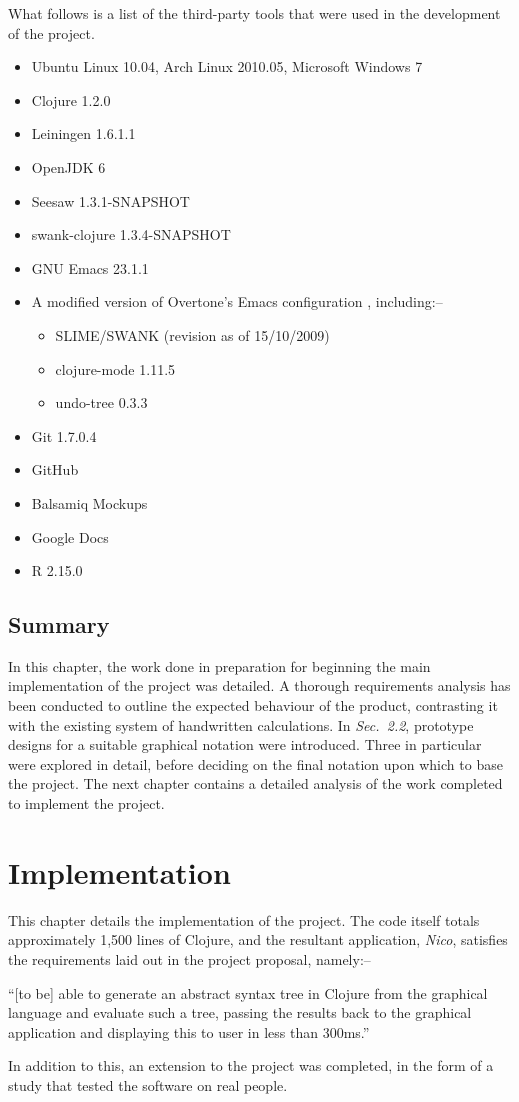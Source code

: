 \documentclass[12pt,twoside,notitlepage,xetex]{report}
\begin{document}
What follows is a list of the third-party tools that were used in the
development of the project.
\begin{itemize}
\item Ubuntu Linux 10.04, Arch Linux 2010.05, Microsoft Windows 7
\item Clojure 1.2.0
\item Leiningen 1.6.1.1
\item OpenJDK 6
\item Seesaw 1.3.1-SNAPSHOT
\item swank-clojure 1.3.4-SNAPSHOT
\item GNU Emacs 23.1.1
\item A modified version of Overtone's Emacs configuration \cite{OvertoneEmacsD}, including:--
\begin{itemize}
\item SLIME/SWANK (revision as of 15/10/2009)
\item clojure-mode 1.11.5
\item undo-tree 0.3.3
\end{itemize}
\item Git 1.7.0.4
\item GitHub
\item Balsamiq Mockups
\item Google Docs
\item R 2.15.0
\end{itemize}

\section{Summary}

In this chapter, the work done in preparation for beginning the main
implementation of the project was detailed.  A thorough requirements analysis
has been conducted to outline the expected behaviour of the product,
contrasting it with the existing system of handwritten calculations.  In
\emph{Sec.~2.2}, prototype designs for a suitable graphical notation were
introduced.  Three in particular were explored in detail, before deciding on
the final notation upon which to base the project.  The next chapter contains a
detailed analysis of the work completed to implement the project.

\cleardoublepage
\chapter{Implementation}

This chapter details the implementation of the project.  The code itself totals
approximately 1,500 lines of Clojure, and the resultant application,
\emph{Nico}, satisfies the requirements laid out in the project proposal,
namely:--
\begin{center}
\parbox[c]{\textwidth-2cm}{
\small
``[to be] able to generate an abstract syntax tree in Clojure from the graphical language and evaluate such a tree, passing the results back to the graphical application and displaying this to user in less than 300ms.''
}
\end{center}
In addition to this, an extension to the project was completed, in the form of
a study that tested the software on real people.
\end{document}
